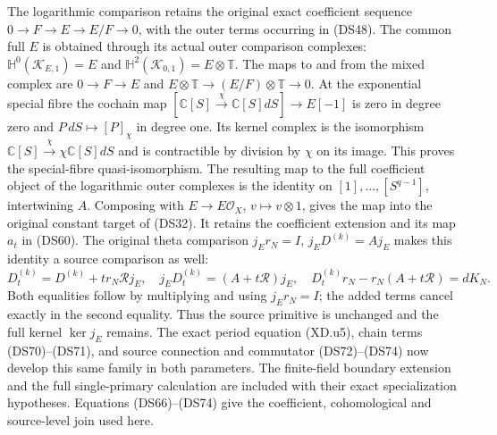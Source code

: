 The logarithmic comparison retains the original exact coefficient
sequence $0\to F\to E\to E/F\to0$, with the outer terms occurring
in (DS48).  The common full $E$ is obtained through its actual
outer comparison complexes:
$\mathbb H^0(\mathscr K_{E,1})=E$ and
$\mathbb H^2(\mathscr K_{0,1})=E\otimes\mathbb T$.
The maps to and from the mixed complex are $0\to F\to E$ and
$E\otimes\mathbb T\to(E/F)\otimes\mathbb T\to0$.
At the exponential special fibre the cochain map
$[\mathbb C[S]\xrightarrow{\chi}\mathbb C[S]dS]\to E[-1]$
is zero in degree zero and $P\,dS\mapsto[P]_\chi$ in degree one.
Its kernel complex is the isomorphism
$\mathbb C[S]\xrightarrow{\chi}\chi\mathbb C[S]dS$ and is
contractible by division by $\chi$ on its image.  This proves
the special-fibre quasi-isomorphism.  The resulting map to the
full coefficient object of the logarithmic outer complexes is
the identity on $[1],\ldots,[S^{q-1}]$, intertwining $A$.
Composing with $E\to E\mathcal O_X$, $v\mapsto v\otimes1$,
gives the map into the original constant target of (DS32).
It retains the coefficient extension and its map $a_t$ in (DS60).
The original theta comparison $j_Er_N=I$,
$j_ED^{(k)}=Aj_E$ makes this identity a source comparison as well:
\[
 D_t^{(k)}=D^{(k)}+t r_N\mathcal Rj_E,
 \quad j_ED_t^{(k)}=(A+t\mathcal R)j_E,
 \quad D_t^{(k)}r_N-r_N(A+t\mathcal R)=dK_N.
 \tag{DS69}
\]
Both equalities follow by multiplying and using $j_Er_N=I$;
the added terms cancel exactly in the second equality.  Thus the
source primitive is unchanged and the full kernel $\ker j_E$
remains.  The exact period equation (XD.u5), chain terms (DS70)--(DS71),
and source connection and commutator (DS72)--(DS74) now develop this
same family in both parameters. The finite-field boundary extension
and the full single-primary calculation are included with their exact
specialization hypotheses. Equations (DS66)--(DS74) give the
coefficient, cohomological and source-level join used here.


\endgroup
